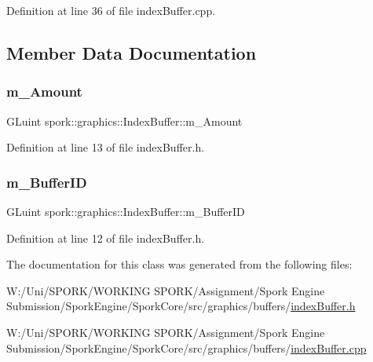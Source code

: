 Definition at line 36 of file index\+Buffer.\+cpp.



\subsection{Member Data Documentation}
\mbox{\label{classspork_1_1graphics_1_1_index_buffer_aa4732fff43b9517bc9923a7c9aae2026}} 
\subsubsection{\texorpdfstring{m\+\_\+\+Amount}{m\_Amount}}
{\footnotesize\ttfamily G\+Luint spork\+::graphics\+::\+Index\+Buffer\+::m\+\_\+\+Amount\hspace{0.3cm}{\ttfamily [private]}}



Definition at line 13 of file index\+Buffer.\+h.

\mbox{\label{classspork_1_1graphics_1_1_index_buffer_a98bb89453d6aa9c3cf5941abc4276330}} 
\subsubsection{\texorpdfstring{m\+\_\+\+Buffer\+ID}{m\_BufferID}}
{\footnotesize\ttfamily G\+Luint spork\+::graphics\+::\+Index\+Buffer\+::m\+\_\+\+Buffer\+ID\hspace{0.3cm}{\ttfamily [private]}}



Definition at line 12 of file index\+Buffer.\+h.



The documentation for this class was generated from the following files\+:\begin{DoxyCompactItemize}
\item 
W\+:/\+Uni/\+S\+P\+O\+R\+K/\+W\+O\+R\+K\+I\+N\+G S\+P\+O\+R\+K/\+Assignment/\+Spork Engine Submission/\+Spork\+Engine/\+Spork\+Core/src/graphics/buffers/\hyperlink{index_buffer_8h}{index\+Buffer.\+h}\item 
W\+:/\+Uni/\+S\+P\+O\+R\+K/\+W\+O\+R\+K\+I\+N\+G S\+P\+O\+R\+K/\+Assignment/\+Spork Engine Submission/\+Spork\+Engine/\+Spork\+Core/src/graphics/buffers/\hyperlink{index_buffer_8cpp}{index\+Buffer.\+cpp}\end{DoxyCompactItemize}

